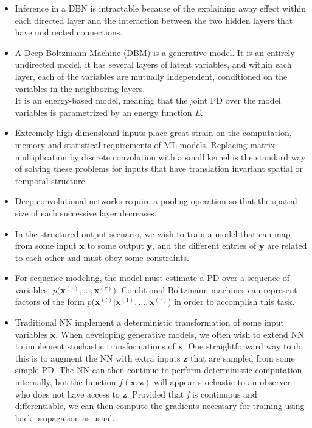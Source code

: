 \documentclass{article}
\begin{document}
\begin{itemize}
\item Inference in a DBN is intractable because of the explaining away effect within each directed layer and the interaction between the two hidden layers that have undirected connections.
\item A Deep Boltzmann Machine (DBM) is a generative model. It is an entirely undirected model, it has several layers of latent variables, and within each layer, each of the variables are mutually independent, conditioned on the variables in the neighboring layers.\\It is an energy-based model, meaning that the joint PD over the model variables is parametrized by an energy function \textit{E}.
\item Extremely high-dimensional inputs place great strain on the computation, memory and statistical requirements of ML models. Replacing matrix multiplication by discrete convolution with a small kernel is the standard way of solving these problems for inputs that have translation invariant spatial or temporal structure.
\item Deep convolutional networks require a pooling operation so that the spatial size of each successive layer decreases.
\item In the structured output scenario, we wish to train a model that can map from some input \(\boldsymbol{x}\) to some output \(\boldsymbol{y}\), and the different entries of \(\boldsymbol{y}\) are related to each other and must obey some constraints.
\item For sequence modeling, the model must estimate a PD over a sequence of variables, \(p(\)\textbf{x}\(^{(1)},\dots,\)\textbf{x}\(^{(\tau)})\). Conditional Boltzmann machines can represent factors of the form \(p(\)\textbf{x}\(^{(t)}|\)\textbf{x}\(^{(1)},\dots,\)\textbf{x}\(^{(\tau)})\) in order to accomplish this task.
\item Traditional NN implement a deterministic transformation of some input variables \(\boldsymbol{x}\). When developing generative models, we often wish to extend NN to implement stochastic transformations of \(\boldsymbol{x}\). One straightforward way to do this is to augment the NN with extra inputs \(\boldsymbol{z}\) that are sampled from some simple PD. The NN can then continue to perform deterministic computation internally, but the function \(f(\boldsymbol{x},\boldsymbol{z})\) will appear stochastic to an observer who does not have access to \(\boldsymbol{z}\). Provided that \textit{f} is continuous and differentiable, we can then compute the gradients necessary for training using back-propagation as usual.

\end{itemize}
\end{document}
